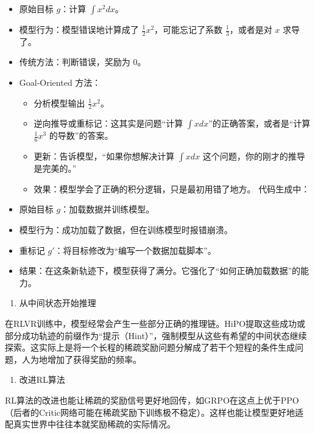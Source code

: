 \begin{itemize}
\tightlist
\item
  原始目标 \(g\)：计算 \(\int x^2 dx\)。
\item
  模型行为：模型错误地计算成了 \(\frac{1}{2}x^2\)，可能忘记了系数 \(\frac{1}{3}\)，或者是对 \(x\) 求导了。
\item
  传统方法：判断错误，奖励为 0。
\item
  Goal-Oriented 方法：

  \begin{itemize}
  \tightlist
  \item
    分析模型输出 \(\frac{1}{2}x^2\)。
  \item
    逆向推导或重标记：这其实是问题``计算 \(\int x dx\)''的正确答案，或者是``计算 \(\frac{1}{6}x^3\) 的导数''的答案。
  \item
    更新：告诉模型，``如果你想解决计算 \(\int x dx\) 这个问题，你的刚才的推导是完美的。''
  \item
    效果：模型学会了正确的积分逻辑，只是最初用错了地方。
    代码生成中：
  \end{itemize}
\item
  原始目标 \(g\)：加载数据并训练模型。
\item
  模型行为：成功加载了数据，但在训练模型时报错崩溃。
\item
  重标记 \(g'\)：将目标修改为``编写一个数据加载脚本''。
\item
  结果：在这条新轨迹下，模型获得了满分。它强化了``如何正确加载数据''的能力。
\end{itemize}

\begin{enumerate}
\def\labelenumi{\arabic{enumi}.}
\setcounter{enumi}{3}
\tightlist
\item
  从中间状态开始推理
\end{enumerate}

在RLVR训练中，模型经常会产生一些部分正确的推理链。HiPO提取这些成功或部分成功轨迹的前缀作为``提示（Hint）''，强制模型从这些有希望的中间状态继续探索。这实际上是将一个长程的稀疏奖励问题分解成了若干个短程的条件生成问题，人为地增加了获得奖励的频率。

\begin{enumerate}
\def\labelenumi{\arabic{enumi}.}
\setcounter{enumi}{4}
\tightlist
\item
  改进RL算法
\end{enumerate}

RL算法的改进也能让稀疏的奖励信号更好地回传，如GRPO在这点上优于PPO（后者的Critic网络可能在稀疏奖励下训练极不稳定）。这样也能让模型更好地适配真实世界中往往本就奖励稀疏的实际情况。


